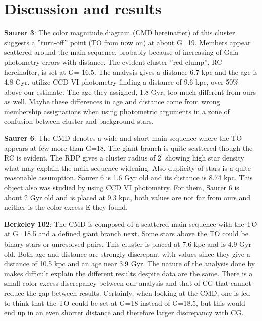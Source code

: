 \documentclass{aa}
\begin{document}
\section{Discussion and results}
 \label{sec:results}

\textbf{Saurer 3}:
The color magnitude diagram (CMD hereinafter) of this cluster suggests a ''turn-off'' point (TO from now on) at about G=19. Members appear scattered around the main sequence, probably because of increasing of Gaia photometry errors with distance. The evident cluster ''red-clump'', RC hereinafter, is set at G= 16.5. The analysis gives a distance 6.7 kpc and the age is 4.8 Gyr. \cite{2003MNRAS.346...18C} utilize CCD VI photometry finding a distance of 9.6 kpc, over 50\% above our estimate. The age they assigned, 1.8 Gyr, too much different from ours as well. Maybe these differences in age and distance come from wrong membership assignations when using photometric arguments in a zone of confusion between cluster and background stars. 

\textbf{Saurer 6}:
The CMD denotes a wide and short main sequence where the TO appears at few more than G=18. The giant branch is quite scattered though the RC is evident. The RDP gives a cluster radius of $2^{\prime}$ showing high star density what may explain the main sequence widening. Also duplicity of stars is a quite reasonable assumption. Saurer 6 is 1.6 Gyr old and its distance is 8.74 kpc. This object also was studied by \cite{2002AJ....123.2552F} using CCD VI photometry. For them, Saurer 6 is about 2 Gyr old and is placed at 9.3 kpc, both values are not far from ours and neither is the color excess E they found.

\textbf{Berkeley 102}:
 The CMD is composed of a scattered main sequence with the TO at G=18.5 and a defined giant branch next. Some stars above the TO could be binary stars or unresolved pairs. This cluster is placed at 7.6 kpc and is 4.9 Gyr old. Both age and distance are strongly discrepant with \cite{Cantat_2020} values since they give a distance of 10.5 kpc and an age near 3.9 Gyr. The nature of the analysis done by \cite{Cantat_2020} makes difficult explain the different results despite data are the same. There is a small color excess discrepancy between our analysis and that of CG that cannot reduce the gap between results. Certainly, when looking at the CMD, one is led to think that the TO could be set at G=18 instead of G=18.5, but this would end up in an even shorter distance and therefore larger discrepancy with CG.  
\end{document}
